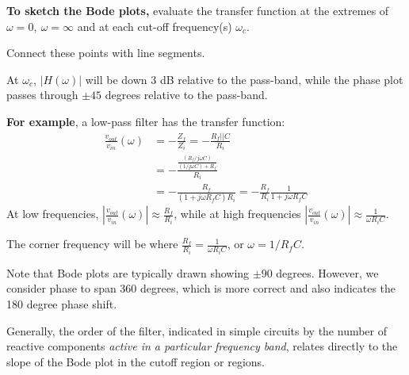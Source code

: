 \textbf{To sketch the Bode plots,} evaluate the transfer function at
the extremes of $\omega=0,~\omega=\infty $ and at each cut-off
frequency(s) $\omega_{c}$.

Connect these points with line segments. 

At $\omega_{c}$, $|H(\omega)|$ will be down 3 dB relative to the
pass-band, while the phase plot passes through $\pm 45$ degrees
relative to the pass-band.

\textbf{For example}, a low-pass filter has the transfer function:
\begin{equation}
\begin{split}
\frac{v_{out}}{v_{in}}(\omega)&= -\frac{Z_{f}}{Z_{i}}=
-\frac{R_{f}||C}{R_{i}}\\ &= -\frac{\frac{(R_{f}/j\omega
C)}{(1/j\omega C)+R_{f}}}{R_{i}}\\ &= -\frac{R_{f}}{(1+j\omega
R_{f}C)R_{i}} = -\frac{R_{f}}{R_{i}}\frac{1}{1+j\omega R_{f}C}
\end{split}
\end{equation}
At low frequencies, $|\frac{v_{out}}{v_{in}}(\omega)| \approx
\frac{R_{f}}{R_{i}}$, while at high frequencies
$|\frac{v_{out}}{v_{in}}(\omega)| \approx \frac{1}{\omega
R_{i}C}$.

The corner frequency will be where $\frac{R_{f}}{R_{i}}=
\frac{1}{\omega R_{i}C}$, or $\omega = 1/R_{f}C$.

Note that Bode plots are typically drawn showing $\pm 90$ degrees.
However, we consider phase to span 360 degrees, which is more correct
and also indicates the 180 degree phase shift.

Generally, the order of the filter, indicated in simple circuits by
the number of reactive components \textit{active in a particular
frequency band}, relates directly to the slope of the Bode plot in the
cutoff region or regions.


